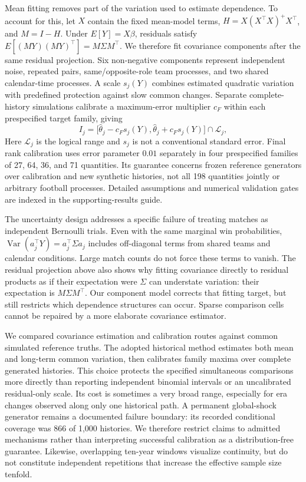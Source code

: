 Mean fitting removes part of the variation used to estimate dependence. To account for this, let $X$ contain the fixed mean-model terms, $H=X(X^\top X)^+X^\top$, and $M=I-H$. Under $E[Y]=X\beta$, residuals satisfy $E[(MY)(MY)^\top]=M\Sigma M^\top$. We therefore fit covariance components after the same residual projection. Six non-negative components represent independent noise, repeated pairs, same/opposite-role team processes, and two shared calendar-time processes. A scale $s_j(Y)$ combines estimated quadratic variation with predefined protection against slow common changes. Separate complete-history simulations calibrate a maximum-error multiplier $c_F$ within each prespecified target family, giving
\begin{equation}
 I_j=\bigl[\widehat\theta_j-c_Fs_j(Y),\widehat\theta_j+c_Fs_j(Y)\bigr]\cap\mathcal L_j,
 \label{eq:conditional-envelope}
\end{equation}
Here $\mathcal L_j$ is the logical range and $s_j$ is not a conventional standard error. Final rank calibration uses error parameter $0.01$ separately in four prespecified families of 27, 64, 36, and 71 quantities. Its guarantee concerns frozen reference generators over calibration and new synthetic histories, not all 198 quantities jointly or arbitrary football processes. Detailed assumptions and numerical validation gates are indexed in the supporting-results guide.

The uncertainty design addresses a specific failure of treating matches as independent Bernoulli trials. Even with the same marginal win probabilities, $\operatorname{Var}(a_j^\top Y)=a_j^\top\Sigma a_j$ includes off-diagonal terms from shared teams and calendar conditions. Large match counts do not force these terms to vanish. The residual projection above also shows why fitting covariance directly to residual products as if their expectation were $\Sigma$ can understate variation: their expectation is $M\Sigma M^\top$. Our component model corrects that fitting target, but still restricts which dependence structures can occur. Sparse comparison cells cannot be repaired by a more elaborate covariance estimator.

We compared covariance estimation and calibration routes against common simulated reference truths. The adopted historical method estimates both mean and long-term common variation, then calibrates family maxima over complete generated histories. This choice protects the specified simultaneous comparisons more directly than reporting independent binomial intervals or an uncalibrated residual-only scale. Its cost is sometimes a very broad range, especially for era changes observed along only one historical path. A permanent global-shock generator remains a documented failure boundary: its recorded conditional coverage was 866 of 1,000 histories. We therefore restrict claims to admitted mechanisms rather than interpreting successful calibration as a distribution-free guarantee. Likewise, overlapping ten-year windows visualize continuity, but do not constitute independent repetitions that increase the effective sample size tenfold.


